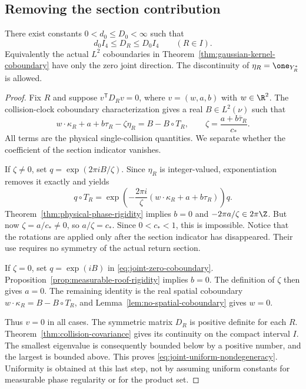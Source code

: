 \subsection{Removing the section contribution}
\begin{theorem}
\label{thm:joint-uniform-nondegeneracy}
There exist constants $0<d_0\le D_0<\infty$ such that
\begin{equation}\label{eq:joint-uniform-nondegeneracy}
 d_0I_4\le D_R\le D_0I_4\qquad(R\in I).
\end{equation}
Equivalently the actual $L^2$ coboundaries in
Theorem~\ref{thm:gaussian-kernel-coboundary} have only the zero joint
direction. The discontinuity of $\eta_R=\one_{Y_R^*}$ is allowed.
\end{theorem}
\begin{proof}
Fix $R$ and suppose $v^{\mathsf T}D_Rv=0$, where $v=(w,a,b)$ with
$w\in\R^2$. The collision-clock coboundary characterization gives a
real $B\in L^2(\nu)$ such that
\begin{equation}\label{eq:joint-zero-coboundary}
 w\cdot\kappa_R+a+b\tau_R-\zeta\eta_R=B-B\circ T_R,
 \qquad \zeta=\frac{a+b\bar\tau_R}{c_*}.
\end{equation}
All terms are the physical single-collision quantities. We separate
whether the coefficient of the section indicator vanishes.

If $\zeta\ne0$, set $q=\exp(2\pi i B/\zeta)$. Since $\eta_R$ is
integer-valued, exponentiation removes it exactly and yields
\[
 q\circ T_R
 =\exp\!\left(-\frac{2\pi i}{\zeta}
          (w\cdot\kappa_R+a+b\tau_R)\right)q.
\]
Theorem~\ref{thm:physical-phase-rigidity} implies $b=0$ and
$-2\pi a/\zeta\in2\pi\Z$. But now
$\zeta=a/c_*\ne0$, so $a/\zeta=c_*$. Since $0<c_*<1$, this is
impossible. Notice that the rotations are applied only after the
section indicator has disappeared. Their use requires no symmetry of
the actual return section.

If $\zeta=0$, set $q=\exp(iB)$ in
\eqref{eq:joint-zero-coboundary}. Proposition~\ref{prop:measurable-roof-rigidity}
implies $b=0$. The definition of $\zeta$ then gives $a=0$.
The remaining identity is the real spatial coboundary
$w\cdot\kappa_R=B-B\circ T_R$, and
Lemma~\ref{lem:no-spatial-coboundary} gives $w=0$.

Thus $v=0$ in all cases. The symmetric matrix $D_R$ is positive definite
for each $R$. Theorem~\ref{thm:collision-covariance} gives its continuity
on the compact interval $I$. The smallest eigenvalue is consequently
bounded below by a positive number, and the largest is bounded above.
This proves \eqref{eq:joint-uniform-nondegeneracy}. Uniformity is obtained
at this last step, not by assuming uniform constants for measurable
phase regularity or for the product set.
\end{proof}

